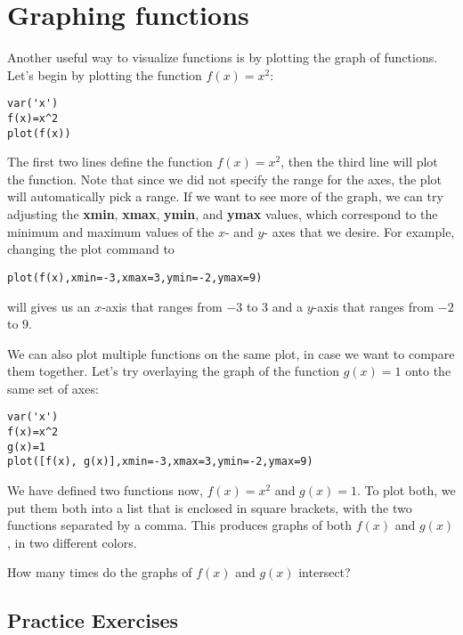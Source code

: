 \section{Graphing functions}

Another useful way to visualize functions is by plotting the graph of
functions. Let's begin by plotting the function $f(x)=x^2$:

\begin{verbatim}
var('x')
f(x)=x^2
plot(f(x))
\end{verbatim}

The first two lines define the function $f(x)=x^2$, then the third line will plot
the function. Note that since we did not specify the range for the axes, the
plot will automatically pick a range. If we want to see more of the graph, we
can try adjusting the \textbf{xmin}, \textbf{xmax}, \textbf{ymin}, and \textbf{ymax}
values, which correspond to the minimum and maximum values of the
$x$- and $y$- axes that we desire. For example, changing the plot
command to

\begin{verbatim}
plot(f(x),xmin=-3,xmax=3,ymin=-2,ymax=9)
\end{verbatim}

will gives us an $x$-axis that ranges from $-3$ to $3$ and a $y$-axis that
ranges from $-2$ to $9$.

We can also plot multiple functions on the same plot, in case we
want to compare them together. Let's try overlaying the graph of
the function $g(x)=1$ onto the same set of axes:

\begin{verbatim}
var('x')
f(x)=x^2
g(x)=1
plot([f(x), g(x)],xmin=-3,xmax=3,ymin=-2,ymax=9)
\end{verbatim}

We have defined two functions now, $f(x)=x^2$ and $g(x)=1$. To
plot both, we put them both into a list that is enclosed in square
brackets, with the two functions separated by a comma. This produces
graphs of both $f(x)$ and $g(x)$, in two different colors.

How many times do the graphs of $f(x)$ and $g(x)$ intersect?

\subsection{Practice Exercises}

